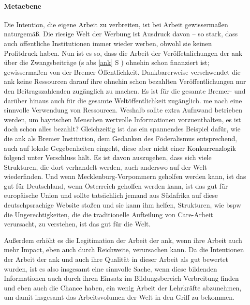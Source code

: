 \paragraph{Metaebene}
Die Intention, die eigene Arbeit zu verbreiten, ist bei Arbeit gewissermaßen naturgemäß. Die riesige Welt der Werbung ist Ausdruck davon -- so stark, dass auch öffentliche Institutionen immer wieder werben, obwohl sie keinen Profitdruck haben. 
Nun ist es so, dass die Arbeit der Veröffetnlichungen der \gls{ank} über die Zwangsbeiträge (\gls{s} \gls{abs} \ref{ank} \gls{S} \pageref{ank}) ohnehin schon finanziert ist; gewissermaßen von der Bremer Öffentlichkeit. Dankbarerweise verschwendet die \gls{ank} keine Ressourcen darauf ihre ohnehin schon bezahlten Veröffentlichungen nur den Beitragszahlenden zugänglich zu machen. Es ist für die gesamte Bremer- und darüber hinaus auch für die gesamte Weltöffentlichkeit zugänglich. \Gls{me} nach eine sinnvolle Verwendung von Ressourcen. Weshalb sollte extra Aufnwand betrieben werden, um bayrischen Menschen wertvolle Informationen vorzuenthalten, es ist doch schon alles bezahlt? 
Gleichzeitig ist das ein spannendes Beispiel dafür, wie die \gls{ank} als Bremer Institution, dem Gedanken des Föderalismus entsprechend, auch auf lokale Gegebenheiten eingeht, diese aber nicht einer Konkurrenzlogik folgend unter Verschluss hält. Es ist davon auszugehen, dass sich viele Strukturen, die dort verhandelt werden, auch anderswo auf der Welt wiederfinden. Und wenn Mecklenburg-Vorpommern geholfen werden kann, ist das gut für Deutschland, wenn Österreich geholfen werden kann, ist das gut für europäische Union und sollte tatsächlich jemand aus Südafrika auf diese deutschpsrachige Website stoßen und sie kann ihm helfen, Strukturen, wie \gls{bspw} die Ungerechtigkeiten, die die traditionelle Aufteilung von Care-Arbeit verursacht, zu verstehen, ist das gut für die Welt. 

Außerdem erhöht es die Legitimation der Arbeit der \gls{ank}, wenn ihre Arbeit auch mehr Impact, eben auch durch Reichweite, verursachen kann. Da die Intentionen der Arbeit der \gls{ank} und auch ihre Qualität in dieser Arbeit als gut bewertet wurden, ist es also insgesamt eine sinnvolle Sache, wenn diese bildenden Informationen auch durch ihren Einsatz im Bildungsbereich Verbreitung finden und eben auch die Chance haben, ein wenig Arbeit der Lehrkräfte abzunehmen, um damit insgesamt das Arbeitsvolumen der Welt in den Griff zu bekommen. 


